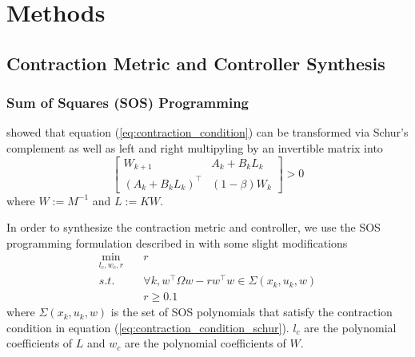 \documentclass[journal]{IEEEtran}
\begin{document}
\section{Methods}
\subsection{Contraction Metric and Controller Synthesis}
\subsubsection{Sum of Squares (SOS) Programming}

\autocite{weiControlContractionMetric2021} showed that equation (\ref{eq:contraction_condition}) can be transformed via Schur's complement as well as left and right multipyling by an invertible matrix into
\begin{equation}
	\begin{bmatrix}
		W_{k+1} & A_k + B_k L_k \\
		(A_k + B_k L_k)^\top & (1 - \beta) W_k
	\end{bmatrix} > 0
	\label{eq:contraction_condition_schur}
\end{equation}
where $W := M^{-1}$ and $L := KW$.

In order to synthesize the contraction metric and controller, we use the SOS programming formulation described in \autocite{weiControlContractionMetric2021} with some slight modifications
\begin{equation}
	\label{eq:dccm_opt}
	\begin{aligned}
	\min_{l_c, w_c, r} \quad& r \\
	s.t. \quad& \forall k, w^\top \Omega w - r w^\top w \in \Sigma(x_k, u_k, w) \\
	& r \geq 0.1
	\end{aligned}
\end{equation}
where $\Sigma(x_k, u_k, w)$ is the set of SOS polynomials that satisfy the contraction condition in equation (\ref{eq:contraction_condition_schur}). $l_c$ are the polynomial coefficients of $L$ and $w_c$ are the polynomial coefficients of $W$.
\end{document}
